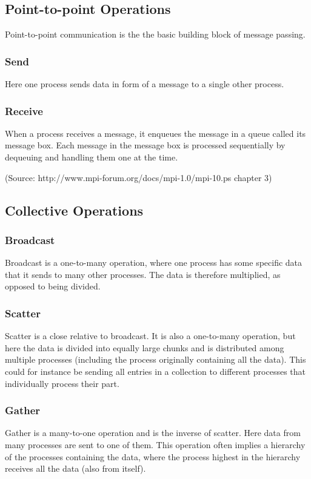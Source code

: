 \subsection{Point-to-point Operations}
Point-to-point communication is the the basic building block of message passing.
\subsubsection{Send}
Here one process sends data in form of a message to a single other process.
\subsubsection{Receive}
When a process receives a message, it enqueues the message in a queue called its message box. Each message in the message box is processed sequentially by dequeuing and handling them one at the time.

(Source: http://www.mpi-forum.org/docs/mpi-1.0/mpi-10.ps chapter 3)

\subsection{Collective Operations}
\subsubsection{Broadcast}
Broadcast is a one-to-many operation, where one process has some specific data that it sends to many other processes. The data is therefore multiplied, as opposed to being divided.

\subsubsection{Scatter}
Scatter is a close relative to broadcast. It is also a one-to-many operation, but here the data is divided into equally large chunks and is distributed among multiple processes (including the process originally containing all the data). This could for instance be sending all entries in a collection to different processes that individually process their part.

\subsubsection{Gather}
Gather is a many-to-one operation and is the inverse of scatter. Here data from many processes are sent to one of them. This operation often implies a hierarchy of the processes containing the data, where the process highest in the hierarchy receives all the data (also from itself).


